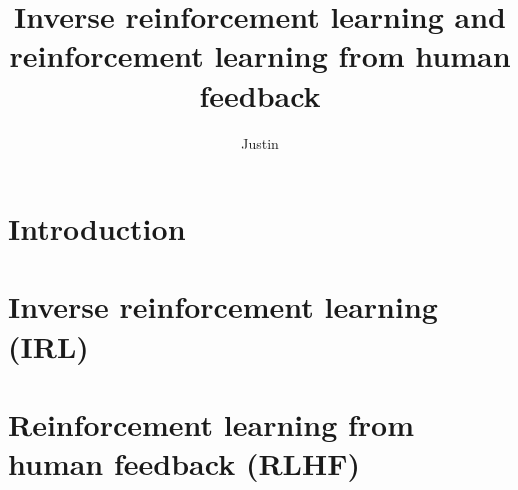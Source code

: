 \documentclass{article}
\begin{document}
\title{Inverse reinforcement learning and reinforcement learning from human feedback}
\author{Justin}
\maketitle

\section{Introduction}

\section{Inverse reinforcement learning (IRL)}

\section{Reinforcement learning from human feedback (RLHF)}
\end{document}
